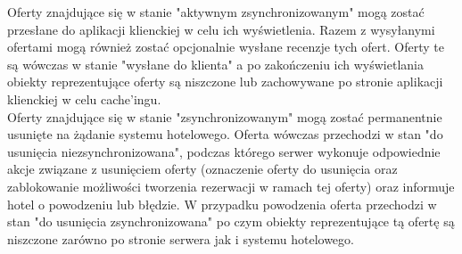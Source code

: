 \documentclass{article}
\begin{document}
\indent Oferty znajdujące się w stanie "aktywnym zsynchronizowanym" mogą zostać przesłane do aplikacji klienckiej w celu ich wyświetlenia. Razem z wysyłanymi ofertami mogą również zostać opcjonalnie wysłane recenzje tych ofert. Oferty te są wówczas w stanie "wysłane do klienta" a po zakończeniu ich wyświetlania obiekty reprezentujące oferty są niszczone lub zachowywane po stronie aplikacji klienckiej w celu cache'ingu.\\
\indent Oferty znajdujące się w stanie "zsynchronizowanym" mogą zostać permanentnie usunięte na żądanie systemu hotelowego. Oferta wówczas przechodzi w stan "do usunięcia niezsynchronizowana", podczas którego serwer wykonuje odpowiednie akcje związane z usunięciem oferty (oznaczenie oferty do usunięcia oraz zablokowanie możliwości tworzenia rezerwacji w ramach tej oferty) oraz informuje hotel o powodzeniu lub błędzie. W przypadku powodzenia oferta przechodzi w stan "do usunięcia zsynchronizowana" po czym obiekty reprezentujące tą ofertę są niszczone zarówno po stronie serwera jak i systemu hotelowego.
\end{document}
